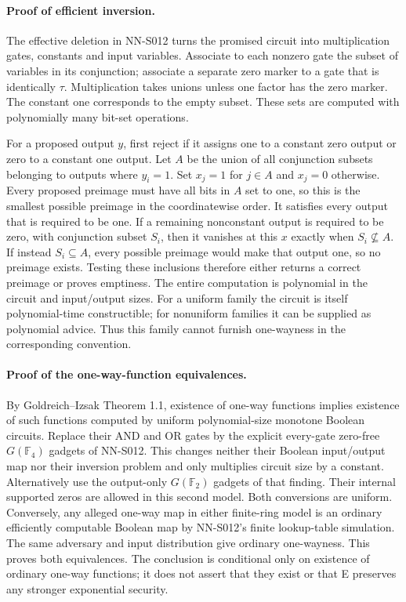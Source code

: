 \paragraph{Proof of efficient inversion.}
The effective deletion in NN-S012 turns the promised circuit into
multiplication gates, constants and input variables. Associate to each
nonzero gate the subset of variables in its conjunction; associate a
separate zero marker to a gate that is identically $\tau$.
Multiplication takes unions unless one factor has the zero marker.
The constant one corresponds to the empty subset. These sets are
computed with polynomially many bit-set operations.

For a proposed output $y$, first reject if it assigns one to a constant
zero output or zero to a constant one output. Let $A$ be the union of
all conjunction subsets belonging to outputs where $y_i=1$. Set
$x_j=1$ for $j\in A$ and $x_j=0$ otherwise. Every proposed preimage
must have all bits in $A$ set to one, so this is the smallest possible
preimage in the coordinatewise order. It satisfies every output that
is required to be one. If a remaining nonconstant output is required
to be zero, with conjunction subset $S_i$, then it vanishes at this
$x$ exactly when $S_i\not\subseteq A$. If instead $S_i\subseteq A$,
every possible preimage would make that output one, so no preimage
exists. Testing these inclusions therefore either returns a correct
preimage or proves emptiness. The entire computation is polynomial
in the circuit and input/output sizes. For a uniform family the
circuit is itself polynomial-time constructible; for nonuniform
families it can be supplied as polynomial advice. Thus this family
cannot furnish one-wayness in the corresponding convention.

\paragraph{Proof of the one-way-function equivalences.}
By Goldreich--Izsak Theorem 1.1, existence of one-way functions implies
existence of such functions computed by uniform polynomial-size
monotone Boolean circuits. Replace their AND and OR gates by the
explicit every-gate zero-free $G(\mathbb F_4)$ gadgets of NN-S012.
This changes neither their Boolean input/output map nor their
inversion problem and only multiplies circuit size by a constant.
Alternatively use the output-only $G(\mathbb F_2)$ gadgets of that
finding. Their internal supported zeros are allowed in this second
model. Both conversions are uniform. Conversely, any alleged
one-way map in either finite-ring model is an ordinary efficiently
computable Boolean map by NN-S012's finite lookup-table simulation.
The same adversary and input distribution give ordinary one-wayness.
This proves both equivalences. The conclusion is conditional only
on existence of ordinary one-way functions; it does not assert that
they exist or that E preserves any stronger exponential security.

